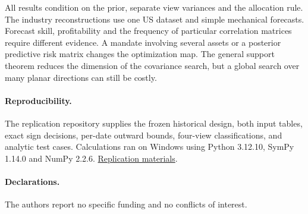 \documentclass[11pt]{article}
\begin{document}
All results condition on the prior, separate view variances and the allocation rule. The industry reconstructions use one US dataset and simple mechanical forecasts. Forecast skill, profitability and the frequency of particular correlation matrices require different evidence. A mandate involving several assets or a posterior predictive risk matrix changes the optimization map. The general support theorem reduces the dimension of the covariance search, but a global search over many planar directions can still be costly.

\paragraph{Reproducibility.} The replication repository supplies the frozen historical design, both input tables, exact sign decisions, per-date outward bounds, four-view classifications, and analytic test cases. Calculations ran on Windows using Python 3.12.10, SymPy 1.14.0 and NumPy 2.2.6. \href{https://github.com/fightforbelief/p13-view-dependence}{Replication materials}.
\paragraph{Declarations.} The authors report no specific funding and no conflicts of interest.
\end{document}
